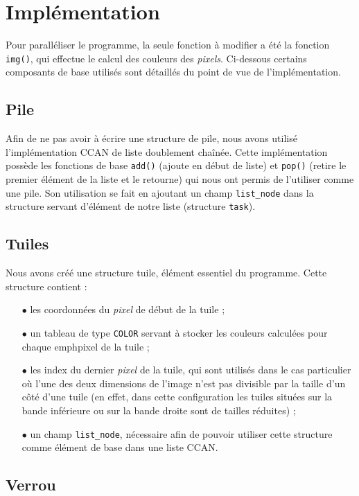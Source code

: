 \section{Implémentation}

Pour paralléliser le programme, la seule fonction à modifier a été la fonction \texttt{img()}, qui effectue le calcul des couleurs des \emph{pixels}. Ci-dessous certains composants de base utilisés sont détaillés du point de vue de l'implémentation.

\subsection{Pile}

Afin de ne pas avoir à écrire une structure de pile, nous avons utilisé l'implémentation CCAN de liste doublement chaînée. Cette implémentation possède les fonctions de base \texttt{add()} (ajoute en début de liste) et \texttt{pop()} (retire le premier élément de la liste et le retourne) qui nous ont permis de l'utiliser comme une pile. Son utilisation se fait en ajoutant un champ \texttt{list\_node} dans la structure servant d'élément de notre liste (structure \texttt{task}).

\subsection{Tuiles}

Nous avons créé une structure tuile, élément essentiel du programme. Cette structure contient :
\begin{itemize}
\item[$\bullet$]les coordonnées du \emph{pixel} de début de la tuile ;
\item[$\bullet$]un tableau de type \texttt{COLOR} servant à stocker les couleurs calculées pour chaque emph{pixel} de la tuile ;
\item[$\bullet$]les index du dernier \emph{pixel} de la tuile, qui sont utilisés dans le cas particulier où l'une des deux dimensions de l'image n'est pas divisible par la taille d'un côté d'une tuile (en effet, dans cette configuration les tuiles situées sur la bande inférieure ou sur la bande droite sont de tailles réduites) ;
\item[$\bullet$]un champ \texttt{list\_node}, nécessaire afin de pouvoir utiliser cette structure comme élément de base dans une liste CCAN.
\end{itemize}

\subsection{Verrou}

